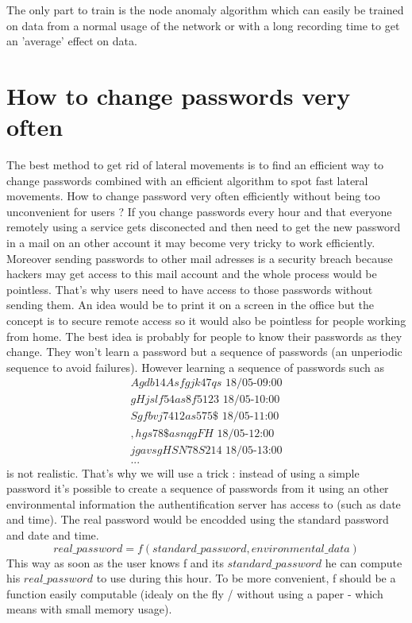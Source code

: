 \documentclass[11pt]{article}
\begin{document}
The only part to train is the node anomaly algorithm which can easily be trained on data from a normal usage of the network or with a long recording time to get an 'average' effect on data.

\section{How to change passwords very often}
The best method to get rid of lateral movements is to find an efficient way to change passwords combined with an efficient algorithm to spot fast lateral movements. How to change password very often efficiently without being too unconvenient for users ? If you change passwords every hour and that everyone remotely using a service gets disconected and then need to get the new password in a mail on an other account it may become very tricky to work efficiently. Moreover sending passwords to other mail adresses is a security breach because hackers may get access to this mail account and the whole process would be pointless.
That's why users need to have access to those passwords without sending them. An idea would be to print it on a screen in the office but the concept is to secure remote access so it would also be pointless for people working from home.
The best idea is probably for people to know their passwords as they change. They won't learn a password but a sequence of passwords (an unperiodic sequence to avoid failures). However learning a sequence of passwords such as 
\begin{equation}
\begin{split}
Agdb14Asfgjk47qs\mbox{ 18/05-09:00}\\
gHjslf54as8f5123\mbox{ 18/05-10:00}\\
Sgfbvj7412as575\$\mbox{ 18/05-11:00}\\
,hgs78\$asnqgFH\mbox{ 18/05-12:00}\\
jgavsgHSN78S214\mbox{ 18/05-13:00}\\
...
\end{split}
\end{equation}
is not realistic. That's why we will use a trick : instead of using a simple password it's possible to create a sequence of passwords from it using an other environmental information the authentification server has access to (such as date and time). The real password would be encodded using the standard password and date and time.
$$ real\_password = f(standard\_password,environmental\_data)$$
This way as soon as the user knows f and its $standard\_password$ he can compute his $real\_password$ to use during this hour. To be more convenient, f should be a function easily computable (idealy on the fly / without using a paper - which means with small memory usage).
\end{document}
